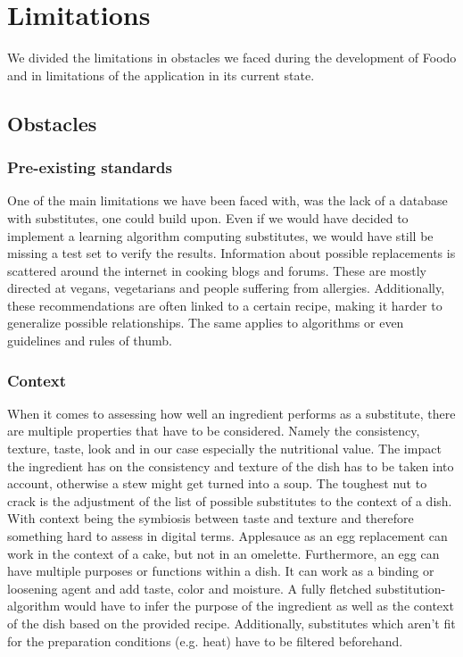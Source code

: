 \chapter{Limitations}

We divided the limitations in obstacles we faced during the development of Foodo and in limitations of the application in its current state.

\section{Obstacles}

\subsection{Pre-existing standards}
One of the main limitations we have been faced with, was the lack of a database with substitutes, one could build upon. Even if we would have decided to implement a learning algorithm computing substitutes, we would have still be missing a test set to verify the results. Information about possible replacements is scattered around the internet in cooking blogs and forums. These are mostly directed at vegans, vegetarians and people suffering from allergies. Additionally, these recommendations are often linked to a certain recipe, making it harder to generalize possible relationships.
The same applies to algorithms or even guidelines and rules of thumb.

\subsection{Context}
When it comes to assessing how well an ingredient performs as a substitute, there are multiple properties that have to be considered. Namely the consistency, texture, taste, look and in our case especially the nutritional value. The impact the ingredient has on the consistency and texture of the dish has to be taken into account, otherwise a stew might get turned into a soup. The toughest nut to crack is the adjustment of the list of possible substitutes to the context of a dish. With context being the symbiosis between taste and texture and therefore something hard to assess in digital terms. Applesauce as an egg replacement can work in the context of a cake, but not in an omelette. Furthermore, an egg can have multiple purposes or functions within a dish. It can work as a binding or loosening agent and add taste, color and moisture. A fully fletched substitution-algorithm would have to infer the purpose of the ingredient as well as the context of the dish based on the provided recipe. Additionally, substitutes which aren’t fit for the preparation conditions (e.g. heat) have to be filtered beforehand. 


